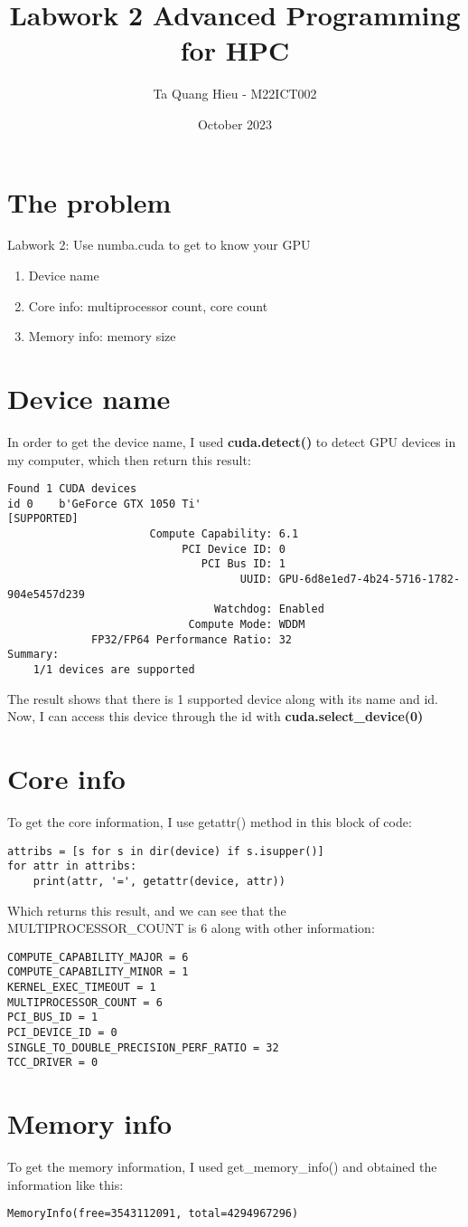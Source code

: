 \documentclass{article}
\title{Labwork 2 Advanced Programming for HPC}
\author{Ta Quang Hieu - M22ICT002}
\date{October 2023}
\begin{document}
\maketitle

\section{The problem}
Labwork 2: Use numba.cuda to get to know your GPU
\begin{enumerate}
    \item Device name
    \item Core info: multiprocessor count, core count
    \item Memory info: memory size
\end{enumerate}

\section{Device name}
In order to get the device name, I used \textbf{cuda.detect()} to detect GPU devices in my computer, which then return this result:
\begin{verbatim}
Found 1 CUDA devices
id 0    b'GeForce GTX 1050 Ti'                              [SUPPORTED]
                      Compute Capability: 6.1
                           PCI Device ID: 0
                              PCI Bus ID: 1
                                    UUID: GPU-6d8e1ed7-4b24-5716-1782-904e5457d239
                                Watchdog: Enabled
                            Compute Mode: WDDM
             FP32/FP64 Performance Ratio: 32
Summary:
    1/1 devices are supported
\end{verbatim}

The result shows that there is 1 supported device along with its name and id. Now, I can access this device through the id with \textbf{cuda.select\_device(0)}

\section{Core info}
To get the core information, I use getattr() method in this block of code:
\begin{verbatim}
attribs = [s for s in dir(device) if s.isupper()]
for attr in attribs:
    print(attr, '=', getattr(device, attr))
\end{verbatim}
Which returns this result, and we can see that the MULTIPROCESSOR\_COUNT is 6 along with other information:
\begin{verbatim}
COMPUTE_CAPABILITY_MAJOR = 6
COMPUTE_CAPABILITY_MINOR = 1
KERNEL_EXEC_TIMEOUT = 1
MULTIPROCESSOR_COUNT = 6
PCI_BUS_ID = 1
PCI_DEVICE_ID = 0
SINGLE_TO_DOUBLE_PRECISION_PERF_RATIO = 32
TCC_DRIVER = 0
\end{verbatim}

\section{Memory info}
To get the memory information, I used get\_memory\_info() and obtained the information like this:
\begin{verbatim}
MemoryInfo(free=3543112091, total=4294967296)
\end{verbatim}
\end{document}
